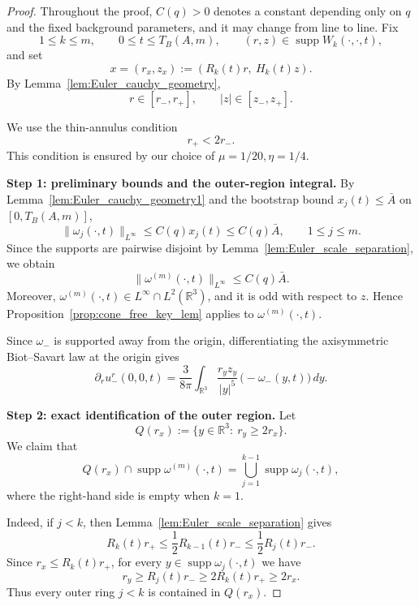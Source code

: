 \documentclass[reqno,11pt]{amsart}
\newcommand{\supp}{\operatorname{supp}}
\begin{document}
\begin{proof}
Throughout the proof, \(C(q)>0\) denotes a constant depending only on \(q\)
and the fixed background parameters, and it may change from line to line.
Fix
\[
1\le k\le m,\qquad 0\le t\le T_B(A,m),\qquad
(r,z)\in\supp W_k(\cdot,\cdot,t),
\]
and set
\[
x=(r_x,z_x):=(R_k(t)r,\ H_k(t)z).
\]
By Lemma~\ref{lem:Euler_cauchy_geometry},
\[
r\in [r_-,r_+],\qquad |z|\in [z_-,z_+].
\]

We use the thin-annulus condition
\[
r_+<2r_-.
\]
This condition is ensured by our choice of $\mu=1/20, \eta=1/4$.

\medskip
\noindent\textbf{Step 1: preliminary bounds and the outer-region integral.}
By Lemma~\ref{lem:Euler_cauchy_geometry1} and the bootstrap bound
\(x_j(t)\le \bar A\) on \([0,T_B(A,m)]\),
\[
\|\omega_j(\cdot,t)\|_{L^\infty}
\le C(q)x_j(t)
\le C(q)\bar A,
\qquad 1\le j\le m.
\]
Since the supports are pairwise disjoint by Lemma~\ref{lem:Euler_scale_separation},
we obtain
\begin{equation}
\label{eq:omega_m_Linf_conefree_boot}
\|\omega^{(m)}(\cdot,t)\|_{L^\infty}\le C(q)\bar A.
\end{equation}
Moreover, \(\omega^{(m)}(\cdot,t)\in L^\infty\cap L^2(\mathbb R^3)\), and it is odd
with respect to \(z\). Hence Proposition~\ref{prop:cone_free_key_lem} applies to
\(\omega^{(m)}(\cdot,t)\).


Since \(\omega_-\) is
supported away from the origin, differentiating the axisymmetric Biot--Savart law
at the origin gives
\begin{equation}
\label{eq:outer_origin_moment_identity_conefree}
\partial_r u_-^r(0,0,t)
=
\frac{3}{8\pi}
\int_{\mathbb R^3}
\frac{r_yz_y}{|y|^5}\,\big(-\omega_-(y,t)\big)\,dy .
\end{equation}


\medskip
\noindent\textbf{Step 2: exact identification of the outer region.}
Let
\[
Q(r_x):=\{y\in\mathbb R^3:\ r_y\ge 2r_x\}.
\]
We claim that
\begin{equation}
\label{eq:Q_exact_outer_rings_conefree}
Q(r_x)\cap\supp\omega^{(m)}(\cdot,t)
=
\bigcup_{j=1}^{k-1}\supp\omega_j(\cdot,t),
\end{equation}
where the right-hand side is empty when \(k=1\).

Indeed, if \(j<k\), then Lemma~\ref{lem:Euler_scale_separation} gives
\[
R_k(t)r_+\le \frac12 R_{k-1}(t)r_-\le \frac12 R_j(t)r_- .
\]
Since \(r_x\le R_k(t)r_+\), for every \(y\in\supp\omega_j(\cdot,t)\) we have
\[
r_y\ge R_j(t)r_-
\ge 2R_k(t)r_+
\ge 2r_x.
\]
Thus every outer ring \(j<k\) is contained in \(Q(r_x)\).


\end{proof}
\end{document}
